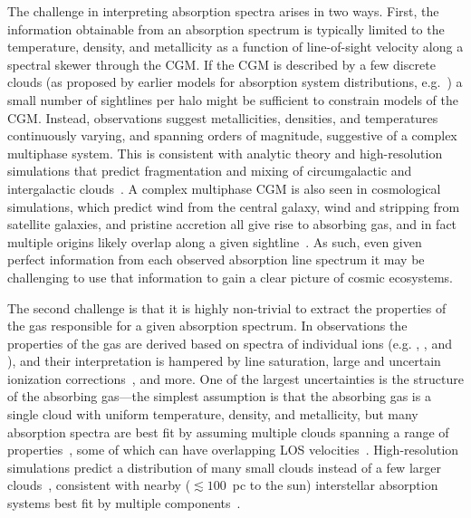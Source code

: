 \documentclass[fleqn,usenatbib]{mnras}
\begin{document}
The challenge in interpreting absorption spectra arises in two ways.
First, the information obtainable from an absorption spectrum is typically limited to the temperature, density, and metallicity as a function of line-of-sight velocity along a spectral skewer through the CGM.
If the CGM is described by a few discrete clouds (as proposed by earlier models for absorption system distributions, e.g.~\citealt{srianand1994Halo, das2001Unified, maller2003Damped}) a small number of sightlines per halo might be sufficient to constrain models of the CGM.
Instead, observations suggest metallicities, densities, and temperatures continuously varying, and spanning orders of magnitude, suggestive of a complex multiphase system.
This is consistent with analytic theory and high-resolution simulations that predict fragmentation and mixing of circumgalactic and intergalactic clouds~\citep[e.g.][]{maller2004Multiphase, mccourt2018Characteristic, hummels2019Impact, vandevoort2019Cosmological, peeples2019Figuring, mandelker2019Shattering, mandelker2021Thermal}.
A complex multiphase CGM is also seen in cosmological simulations, which predict wind from the central galaxy, wind and stripping from satellite galaxies, and pristine accretion all give rise to absorbing gas, and in fact multiple origins likely overlap along a given sightline~\citep[e.g.][]{hafen2019Origins, hafen2020Fates}.
As such, even given perfect information from each observed absorption line spectrum it may be challenging to use that information to gain a clear picture of cosmic ecosystems.

The second challenge is that it is highly non-trivial to extract the properties of the gas responsible for a given absorption spectrum.
In observations the properties of the gas are derived based on spectra of individual ions (e.g. , , and ), and their interpretation is hampered by line saturation, large and uncertain ionization corrections~\citep[e.g.][]{schaye2006Importance, acharya2021How}, and more.
One of the largest uncertainties is the structure of the absorbing gas---the simplest assumption is that the absorbing gas is a single cloud with uniform temperature, density, and metallicity, but many absorption spectra are best fit by assuming multiple clouds spanning a range of properties~\citep[e.g.][]{boksenberg1979Multiple, muzahid2015Extreme, liang2017BayesVP, liang2018Model, haislmaier2021COS, sameer2021Cloudbycloud, zahedy2021.CUBS.III.zle1.LLSs, marra2021.cosmo.sims.test.observational.modeling, narayanan2021.a.multiphase.pLLS, nielsen2022.a.multiphase.DLA}, some of which can have overlapping LOS velocities~\citep[e.g.][]{marra2022Examining}.
High-resolution simulations predict a distribution of many small clouds instead of a few larger clouds~\citep[e.g.][]{fielding2020Multiphase, vijayan2021Xray},
consistent with nearby ($\lesssim 100$~pc to the sun) interstellar absorption systems best fit by multiple components~\citep[e.g.][]{welsh2010HighResolution}.
\end{document}
